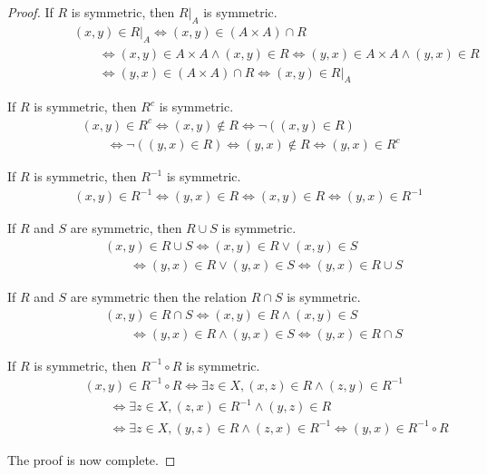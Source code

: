 \documentclass[
  letterpaper,
  10pt,
  reqno,
  twopage,
  openany]{book}
\theoremstyle{plain}
\theoremstyle{definition}
\theoremstyle{definition}
\theoremstyle{definition}
\theoremstyle{plain}
\theoremstyle{plain}
\theoremstyle{remark}
\begin{document}
\begin{proof}

If \(R\) is symmetric, then \(R|_{A}\) is symmetric. \begin{align*}
\qquad \qquad& (x,y)\in R|_A \Longleftrightarrow (x,y) \in (A\times A) \cap R  \\ 
& \qquad \Longleftrightarrow (x,y)\in A\times A \land (x,y)\in R \Longleftrightarrow (y,x)\in A\times A \land (y,x)\in R \\ 
& \qquad \Longleftrightarrow (y,x) \in (A\times A) \cap R  \Longleftrightarrow (x,y)\in R|_A
\end{align*}

If \(R\) is symmetric, then \(R^c\) is symmetric. \begin{align*}
& (x,y)\in R^c \Longleftrightarrow (x,y)\notin R \Longleftrightarrow \neg ((x,y)\in R)  \\
& \qquad \Longleftrightarrow \neg( (y,x)\in R) \Longleftrightarrow (y,x)\notin R \Longleftrightarrow (y,x)\in R^c
\end{align*}

If \(R\) is symmetric, then \(R^{-1}\) is symmetric. \begin{align*}
\qquad (x,y)\in R^{-1} \Longleftrightarrow (y,x)\in R \Longleftrightarrow (x,y)\in R \Longleftrightarrow (y,x)\in R^{-1}
\end{align*}

If \(R\) and \(S\) are symmetric, then \(R\cup S\) is symmetric.
\begin{align*}
\qquad & (x,y)\in R\cup S \Longleftrightarrow (x,y)\in R \lor (x,y)\in S \\ 
& \qquad \Longleftrightarrow (y,x)\in R \lor (y,x)\in S \Longleftrightarrow (y,x)\in R\cup S
\end{align*}

If \(R\) and \(S\) are symmetric then the relation \(R\cap S\) is
symmetric. \begin{align*}
\qquad & (x,y)\in R\cap S \Longleftrightarrow (x,y)\in R \land (x,y)\in S\\ 
& \qquad \Longleftrightarrow (y,x)\in R \land (y,x)\in S \Longleftrightarrow (y,x)\in R\cap S
\end{align*}

If \(R\) is symmetric, then \(R^{-1}\circ R\) is symmetric.
\begin{align*}
\qquad \qquad & (x,y)\in R^{-1}\circ R \Longleftrightarrow \exists z\in X, (x,z)\in R \land (z,y)\in R^{-1} \\ 
& \qquad \Longleftrightarrow \exists z\in X, (z,x)\in R^{-1} \land (y,z)\in R \\ 
& \qquad \Longleftrightarrow \exists z\in X,  (y,z)\in R \land (z,x)\in R^{-1} \Longleftrightarrow (y,x)\in R^{-1}\circ R
\end{align*}

The proof is now complete.

\end{proof}
\end{document}
